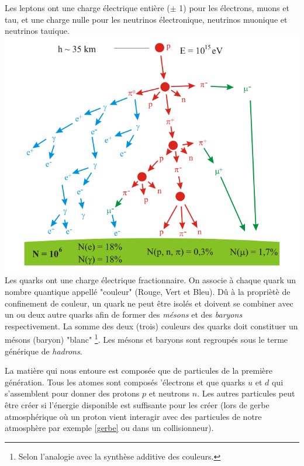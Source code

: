 Les leptons ont une charge électrique entière ($\pm$ 1) pour les électrons, muons et tau, et une charge nulle pour les neutrinos électronique, neutrinos muonique et neutrinos tauique.
\marginpar
{
\hspace*{-0.5cm}
\includegraphics[width=1.2\marginparwidth]{SM/shower.png}
    	\label{gerbe}
}
Les quarks ont une charge électrique fractionnaire. On associe à chaque quark un nombre quantique appellé "couleur" (Rouge, Vert et Bleu). Dû à la propriètè de confinement de couleur, un quark ne peut être isolés et doivent se combiner avec un ou deux autre quarks afin de former des \textit{mésons} et des \textit{baryons} respectivement. La somme des deux (trois) couleurs des quarks doit constituer un mésons (baryon) "blanc" \footnote{Selon l'analogie avec la synthèse additive des couleurs.}. Les mésons et baryons sont regroupés sous le terme générique de \textit{hadrons}.

La matière qui nous entoure est composée que de particules de la première génération. Tous les atomes sont composés 'électrons et que quarks $u$ et $d$ qui s'assemblent pour donner des protons $p$ et neutrons $n$. Les autres particules peut être créer si l'énergie disponible est suffisante pour les créer (lors de gerbe atmosphérique où un proton vient interagir avec des particules de notre atmosphère par exemple \ref{gerbe} ou dans un collisionneur).


